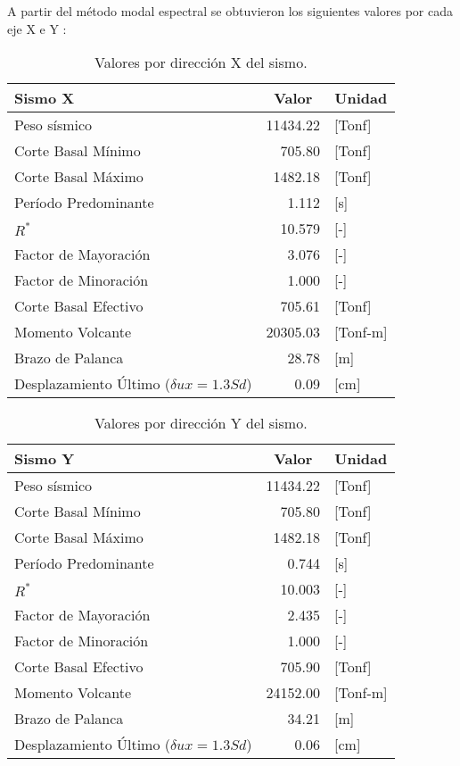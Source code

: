 A partir del método modal espectral se obtuvieron los siguientes valores por cada eje X e Y :

\begin{table}[H]
  \centering
  \caption{Valores por dirección X del sismo.}
  \begin{tabular}{lrl}
    \hline
    \textbf{Sismo X} & \multicolumn{1}{c}{\textbf{Valor}} & \multicolumn{1}{c}{\textbf{Unidad}} \bigstrut\\
    \hline
    Peso sísmico & 11434.22 & [Tonf] \bigstrut[t]\\
    Corte Basal Mínimo & 705.80 & [Tonf] \\
    Corte Basal Máximo & 1482.18 & [Tonf] \\
    Período Predominante & 1.112 & [s] \\
    $R^*$ & 10.579 & [-] \\
    Factor de Mayoración & 3.076 & [-] \\
    Factor de Minoración & 1.000 & [-] \\
    Corte Basal Efectivo & 705.61 & [Tonf] \\
    Momento Volcante & 20305.03 & [Tonf-m] \\
    Brazo de Palanca & 28.78 & [m] \\
    Desplazamiento Último ($\delta ux=1.3Sd$) & 0.09  & [cm] \bigstrut[b]\\
    \hline
  \end{tabular}
\end{table}

\begin{table}[H]
  \centering
  \caption{Valores por dirección Y del sismo.}
  \begin{tabular}{lrl}
    \hline
    \textbf{Sismo Y} & \multicolumn{1}{c}{\textbf{Valor}} & \multicolumn{1}{c}{\textbf{Unidad}} \bigstrut\\
    \hline
    Peso sísmico & 11434.22 & [Tonf] \bigstrut[t]\\
    Corte Basal Mínimo & 705.80 & [Tonf] \\
    Corte Basal Máximo & 1482.18 & [Tonf] \\
    Período Predominante & 0.744 & [s] \\
    $R^*$ & 10.003 & [-] \\
    Factor de Mayoración & 2.435 & [-] \\
    Factor de Minoración & 1.000 & [-] \\
    Corte Basal Efectivo & 705.90 & [Tonf] \\
    Momento Volcante & 24152.00 & [Tonf-m] \\
    Brazo de Palanca & 34.21 & [m] \\
    Desplazamiento Último ($\delta ux=1.3Sd$) & 0.06  & [cm] \bigstrut[b]\\
    \hline
  \end{tabular}
\end{table}

